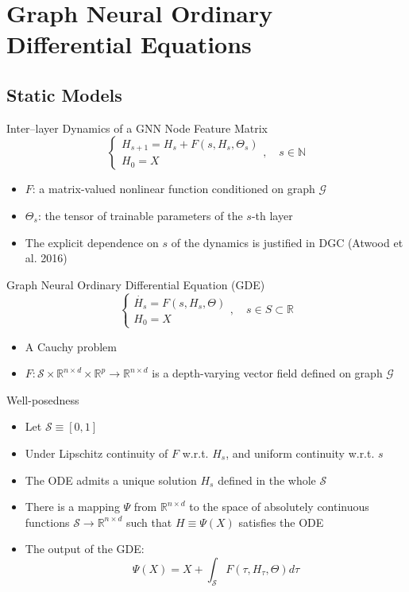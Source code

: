 \documentclass{beamer}
\begin{document}
\section{Graph Neural Ordinary Differential Equations}
\subsection{Static Models}
\begin{frame}{Inter–layer Dynamics of a GNN Node Feature Matrix}
\[
\begin{cases}
H_{s+1}=H_s+F(s,H_s,\Theta_s)\\
H_0=X
\end{cases},\quad s\in\mathbb{N}
\]\begin{itemize}
\item $F$: a matrix-valued nonlinear function conditioned on graph $\mathcal G$
\item $\Theta_s$: the tensor of trainable parameters of the $s$-th layer
\item The explicit dependence on $s$ of the dynamics is justified in DGC (Atwood et al. 2016)
\end{itemize}
\end{frame}

\begin{frame}{Graph Neural Ordinary Differential Equation (GDE)}
\[
\begin{cases}
\dot{H_s}=F(s,H_s,\Theta)\\
H_0=X
\end{cases},\quad s\in S\subset\mathbb{R}
\]\begin{itemize}
\item A Cauchy problem
\item $F: \mathcal{S}\times\mathbb{R}^{n\times d}\times\mathbb{R}^p\to\mathbb{R}^{n\times d}$ is a depth-varying vector field defined on graph $\mathcal{G}$
\end{itemize}
\end{frame}

\begin{frame}{Well-posedness}
\begin{itemize}
\item Let $\mathcal S\equiv[0,1]$
\item Under Lipschitz continuity of $F$ w.r.t. $H_s$, and uniform continuity w.r.t. $s$
\item The ODE admits a unique solution $H_s$ defined in the whole $\mathcal{S}$
\item There is a mapping $\Psi$ from $\mathbb{R}^{n\times d}$ to the space of absolutely continuous functions $\mathcal{S}\to\mathbb{R}^{n\times d}$ such that $H\equiv\Psi(X)$ satisfies the ODE
\item The output of the GDE:\[
\Psi(X)=X+\int_{\mathcal{S}}F(\tau,H_\tau,\Theta)d\tau
\]
\end{itemize}
\end{frame}
\end{document}
